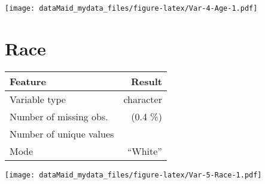 \documentclass[]{report}
\begin{document}
\begin{minipage}{0.25 \textwidth}

\texttt{[image: dataMaid\_mydata\_files/figure-latex/Var-4-Age-1.pdf]}

\end{minipage}

\noindent\makebox[\linewidth]{\rule{\textwidth}{0.4pt}}

\hypertarget{race}{%
\section{Race}\label{race}}

\begin{minipage}{0.75 \textwidth}

\begin{longtable}[]{@{}lr@{}}
\toprule
\begin{minipage}[b]{0.34\columnwidth}\raggedright
Feature\strut
\end{minipage} & \begin{minipage}[b]{0.16\columnwidth}\raggedleft
Result\strut
\end{minipage}\tabularnewline
\midrule
\endhead
\begin{minipage}[t]{0.34\columnwidth}\raggedright
Variable type\strut
\end{minipage} & \begin{minipage}[t]{0.16\columnwidth}\raggedleft
character\strut
\end{minipage}\tabularnewline
\begin{minipage}[t]{0.34\columnwidth}\raggedright
Number of missing obs.\strut
\end{minipage} & \begin{minipage}[t]{0.16\columnwidth}\raggedleft
1 (0.4 \%)\strut
\end{minipage}\tabularnewline
\begin{minipage}[t]{0.34\columnwidth}\raggedright
Number of unique values\strut
\end{minipage} & \begin{minipage}[t]{0.16\columnwidth}\raggedleft
5\strut
\end{minipage}\tabularnewline
\begin{minipage}[t]{0.34\columnwidth}\raggedright
Mode\strut
\end{minipage} & \begin{minipage}[t]{0.16\columnwidth}\raggedleft
``White''\strut
\end{minipage}\tabularnewline
\bottomrule
\end{longtable}

\end{minipage}
\begin{minipage}{0.25 \textwidth}

\texttt{[image: dataMaid\_mydata\_files/figure-latex/Var-5-Race-1.pdf]}

\end{minipage}
\end{document}
